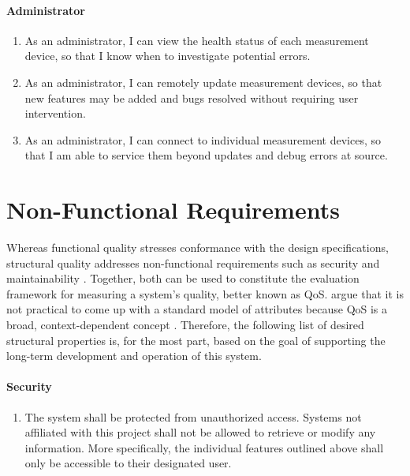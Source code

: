 \paragraph{Administrator}
\begin{enumerate}[resume, font=\sffamily,label={\textbf{FR-\protect\twodigits{\theenumi}}},leftmargin=1.4cm, ref=FR-\protect\twodigits{\theenumi}]
	\item As an administrator, I can view the health status of each measurement device, so that I know when to investigate potential errors.\label{itm:fr-view-health-status}
	\item As an administrator, I can remotely update measurement devices, so that new features may be added and bugs resolved without requiring user intervention.\label{itm:fr-update-device}
	\item As an administrator, I can connect to individual measurement devices, so that I am able to service them beyond updates and debug errors at source.\label{itm:fr-connect-to-device}
\end{enumerate}


\section{Non-Functional Requirements}
\label{sec:non-functional-requirements}

Whereas functional quality stresses conformance with the design specifications, structural quality addresses non-functional requirements such as security and maintainability \cite[p.~2]{Martinez-Ortiz:2016:QMW:3011141.3011203}. Together, both can be used to constitute the evaluation framework for measuring a system's quality, better known as \ac*{QoS}. \citeauthor{Liu:2004:QCP:1013367.1013379} argue that it is not practical to come up with a standard model of attributes because \acs*{QoS} is a broad, context-dependent concept \cite[p.~67]{Liu:2004:QCP:1013367.1013379}. Therefore, the following list of desired structural properties is, for the most part, based on the goal of supporting the long-term development and operation of this system.

\paragraph{Security}
\begin{enumerate}[font=\sffamily, label={\textbf{NFR-\protect\twodigits{\theenumi}}},leftmargin=1.7cm, ref=NFR-\protect\twodigits{\theenumi}]
	\item The system shall be protected from unauthorized access. Systems not affiliated with this project shall not be allowed to retrieve or modify any information. More specifically, the individual features outlined above shall only be accessible to their designated user.\label{itm:nfr-security}
\end{enumerate}

